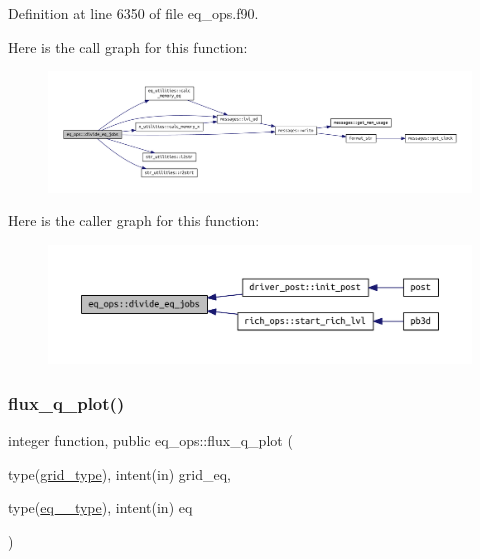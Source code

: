 Definition at line 6350 of file eq\+\_\+ops.\+f90.

Here is the call graph for this function\+:
\nopagebreak
\begin{figure}[H]
\begin{center}
\leavevmode
\includegraphics[width=350pt]{namespaceeq__ops_a8fae749abe55865d8135fef536a8e8f1_cgraph}
\end{center}
\end{figure}
Here is the caller graph for this function\+:
\nopagebreak
\begin{figure}[H]
\begin{center}
\leavevmode
\includegraphics[width=350pt]{namespaceeq__ops_a8fae749abe55865d8135fef536a8e8f1_icgraph}
\end{center}
\end{figure}
\mbox{\label{namespaceeq__ops_af0effe20188d46a44680c2648e4572e9}} 
\subsubsection{\texorpdfstring{flux\+\_\+q\+\_\+plot()}{flux\_q\_plot()}}
{\footnotesize\ttfamily integer function, public eq\+\_\+ops\+::flux\+\_\+q\+\_\+plot (\begin{DoxyParamCaption}\item[{type(\hyperlink{structgrid__vars_1_1grid__type}{grid\+\_\+type}), intent(in)}]{grid\+\_\+eq,  }\item[{type(\hyperlink{structeq__vars_1_1eq__1__type}{eq\+\_\+1\+\_\+type}), intent(in)}]{eq }\end{DoxyParamCaption})}




